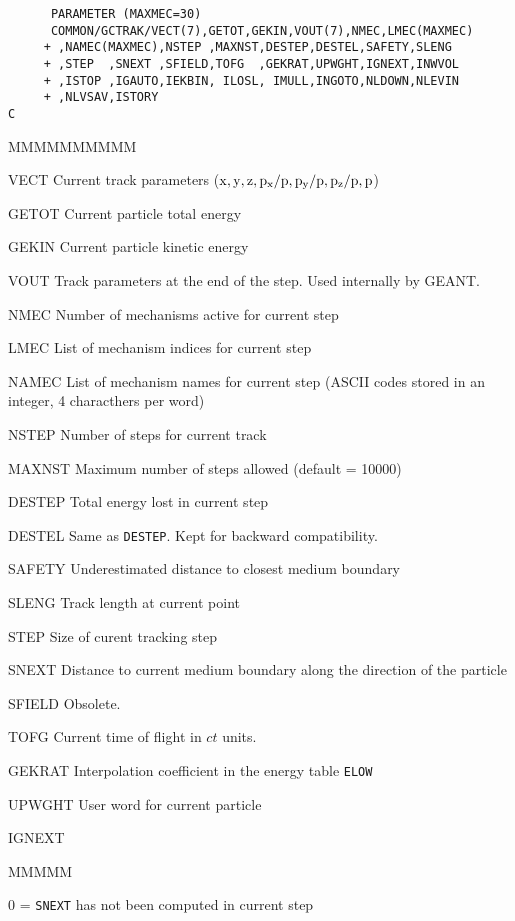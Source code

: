 \begin{verbatim}
      PARAMETER (MAXMEC=30)
      COMMON/GCTRAK/VECT(7),GETOT,GEKIN,VOUT(7),NMEC,LMEC(MAXMEC)
     + ,NAMEC(MAXMEC),NSTEP ,MAXNST,DESTEP,DESTEL,SAFETY,SLENG
     + ,STEP  ,SNEXT ,SFIELD,TOFG  ,GEKRAT,UPWGHT,IGNEXT,INWVOL
     + ,ISTOP ,IGAUTO,IEKBIN, ILOSL, IMULL,INGOTO,NLDOWN,NLEVIN
     + ,NLVSAV,ISTORY
C
\end{verbatim}
\begin{DLtt}{MMMMMMMMMM}
\item[VECT] Current track parameters ($\rm x,y,z,p_x/p,p_y/p,p_z/p,p$)
\item[GETOT]Current particle total energy
\item[GEKIN]Current particle kinetic energy
\item[VOUT]Track parameters at the end of the step. Used internally by
GEANT.
\item[NMEC]Number of mechanisms active for current step
\item[LMEC]List of mechanism indices for current step
\item[NAMEC]List of mechanism names for current step
(ASCII codes stored in an integer, 4 characthers per word)
\item[NSTEP]Number of steps for current track
\item[MAXNST]Maximum number of steps allowed (default = 10000)
\item[DESTEP]Total energy lost in current step
\item[DESTEL]Same as {\tt DESTEP}. Kept for backward compatibility.
\item[SAFETY]Underestimated distance to closest medium boundary
\item[SLENG]Track length at current point
\item[STEP] Size of curent tracking step
\item[SNEXT]Distance to current medium boundary along the direction of
the particle
\item[SFIELD]Obsolete.
\item[TOFG]Current time of flight in $ct$ units.
\item[GEKRAT]Interpolation coefficient in the energy table {\tt ELOW}
\item[UPWGHT]User word for current particle
\item[IGNEXT]
\begin{DLtt}{MMMMM}
\item[0 =]{\tt SNEXT} has not been computed in current step

\end{DLtt}
\end{DLtt}
